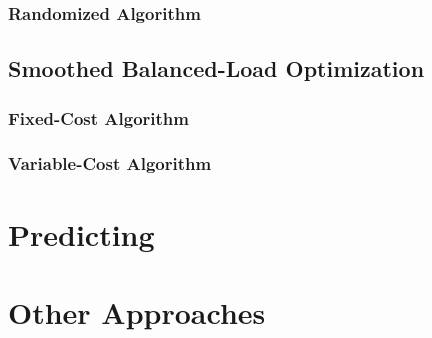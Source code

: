 \subsubsection{Randomized Algorithm}

\subsection{Smoothed Balanced-Load Optimization}

\subsubsection{Fixed-Cost Algorithm}

\subsubsection{Variable-Cost Algorithm}

\section{Predicting}

\section{Other Approaches}
